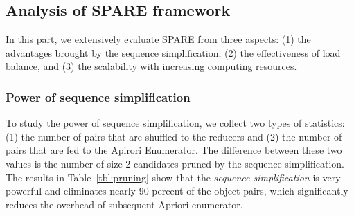 

\vspace{-3mm}
\subsection{Analysis of SPARE framework}
In this part, we extensively evaluate SPARE from three aspects:
(1) the advantages brought by the sequence simplification, (2) the effectiveness of load balance, and (3) the scalability with increasing computing resources.


\subsubsection{Power of sequence simplification}
To study the power of sequence simplification,
we collect two types of statistics: (1) the number of pairs that
are shuffled to the reducers and (2) the number of pairs that
are fed to the Apirori Enumerator. The difference between these two values is the number of size-$2$ candidates pruned by the sequence simplification.
The results in Table~\ref{tbl:pruning} show that the \emph{sequence simplification} is very powerful and eliminates nearly 90 percent of the object pairs, which significantly reduces the overhead of subsequent Apriori enumerator.

